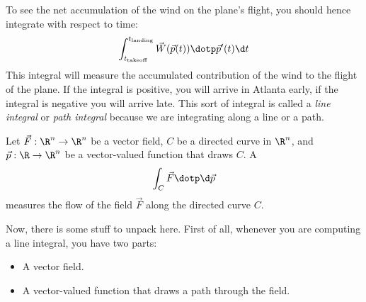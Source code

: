 \documentclass{ximera}
\begin{document}
To see the net accumulation of the wind on the plane's flight, you
should hence integrate with respect to time:
\[
\int_{t_\text{takeoff}}^{t_\text{landing}}
\vec{W}(\vec{p}(t)) \dotp\vec{p}'(t) \d t
\]
This integral will measure the accumulated contribution of the wind to
the flight of the plane. If the integral is positive, you will arrive
in Atlanta early, if the integral is negative you will arrive late.
This sort of integral is called a \textit{line integral} or
\textit{path integral} because we are integrating along a line or a path.

\begin{definition}
  Let $\vec{F}:\R^n\to\R^n$ be a vector field, $C$ be a directed curve
  in $\R^n$, and $\vec{p}:\R\to\R^n$ be a vector-valued function that
  draws $C$.  A 
  \[
  \int_C \vec{F}\dotp \d \vec{p}
  \]
  measures the flow of the field $\vec{F}$ along the directed curve $C$.
\end{definition}

Now, there is some stuff to unpack here. First of all, whenever you
are computing a line integral, you have two parts:
\begin{itemize}
\item A vector field.
\item A vector-valued function that draws a path through the field.
\end{itemize}
\end{document}
